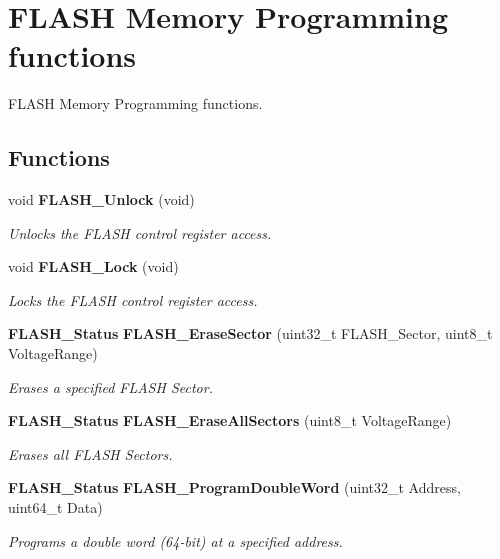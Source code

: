 \section{F\+L\+A\+SH Memory Programming functions}
\label{group__FLASH__Group2}


F\+L\+A\+SH Memory Programming functions.  


\subsection*{Functions}
\begin{DoxyCompactItemize}
\item 
void \textbf{ F\+L\+A\+S\+H\+\_\+\+Unlock} (void)
\begin{DoxyCompactList}\small\item\em Unlocks the F\+L\+A\+SH control register access. \end{DoxyCompactList}\item 
void \textbf{ F\+L\+A\+S\+H\+\_\+\+Lock} (void)
\begin{DoxyCompactList}\small\item\em Locks the F\+L\+A\+SH control register access. \end{DoxyCompactList}\item 
\textbf{ F\+L\+A\+S\+H\+\_\+\+Status} \textbf{ F\+L\+A\+S\+H\+\_\+\+Erase\+Sector} (uint32\+\_\+t F\+L\+A\+S\+H\+\_\+\+Sector, uint8\+\_\+t Voltage\+Range)
\begin{DoxyCompactList}\small\item\em Erases a specified F\+L\+A\+SH Sector. \end{DoxyCompactList}\item 
\textbf{ F\+L\+A\+S\+H\+\_\+\+Status} \textbf{ F\+L\+A\+S\+H\+\_\+\+Erase\+All\+Sectors} (uint8\+\_\+t Voltage\+Range)
\begin{DoxyCompactList}\small\item\em Erases all F\+L\+A\+SH Sectors. \end{DoxyCompactList}\item 
\textbf{ F\+L\+A\+S\+H\+\_\+\+Status} \textbf{ F\+L\+A\+S\+H\+\_\+\+Program\+Double\+Word} (uint32\+\_\+t Address, uint64\+\_\+t Data)
\begin{DoxyCompactList}\small\item\em Programs a double word (64-\/bit) at a specified address. \end{DoxyCompactList}\item 

\end{DoxyCompactItemize}
